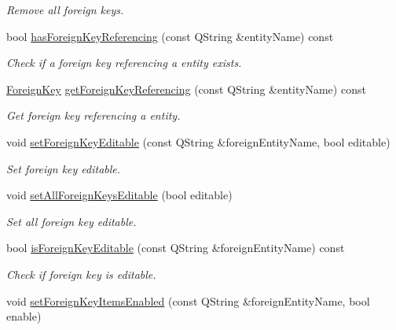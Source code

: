 \begin{DoxyCompactItemize}
\begin{DoxyCompactList}\small\item\em Remove all foreign keys. \end{DoxyCompactList}\item 
bool \hyperlink{class_mdt_1_1_item_model_1_1_foreign_key_proxy_model_map_ad940e0016c2aef5cdbc361e4694580ab}{has\+Foreign\+Key\+Referencing} (const Q\+String \&entity\+Name) const 
\begin{DoxyCompactList}\small\item\em Check if a foreign key referencing a entity exists. \end{DoxyCompactList}\item 
\hyperlink{class_mdt_1_1_item_model_1_1_foreign_key}{Foreign\+Key} \hyperlink{class_mdt_1_1_item_model_1_1_foreign_key_proxy_model_map_ab82d367b28be4991adc4fcb36e6168d6}{get\+Foreign\+Key\+Referencing} (const Q\+String \&entity\+Name) const 
\begin{DoxyCompactList}\small\item\em Get foreign key referencing a entity. \end{DoxyCompactList}\item 
void \hyperlink{class_mdt_1_1_item_model_1_1_foreign_key_proxy_model_map_ad33a24987e9cbf427cac683338a88d2a}{set\+Foreign\+Key\+Editable} (const Q\+String \&foreign\+Entity\+Name, bool editable)
\begin{DoxyCompactList}\small\item\em Set foreign key editable. \end{DoxyCompactList}\item 
void \hyperlink{class_mdt_1_1_item_model_1_1_foreign_key_proxy_model_map_a42f428f656691943d790443451297217}{set\+All\+Foreign\+Keys\+Editable} (bool editable)
\begin{DoxyCompactList}\small\item\em Set all foreign key editable. \end{DoxyCompactList}\item 
bool \hyperlink{class_mdt_1_1_item_model_1_1_foreign_key_proxy_model_map_ac20ee568993aca1576ca32556225a4a9}{is\+Foreign\+Key\+Editable} (const Q\+String \&foreign\+Entity\+Name) const 
\begin{DoxyCompactList}\small\item\em Check if foreign key is editable. \end{DoxyCompactList}\item 
void \hyperlink{class_mdt_1_1_item_model_1_1_foreign_key_proxy_model_map_a2bc5888181a683c01bc0d3d5d1d376f6}{set\+Foreign\+Key\+Items\+Enabled} (const Q\+String \&foreign\+Entity\+Name, bool enable)

\end{DoxyCompactItemize}
